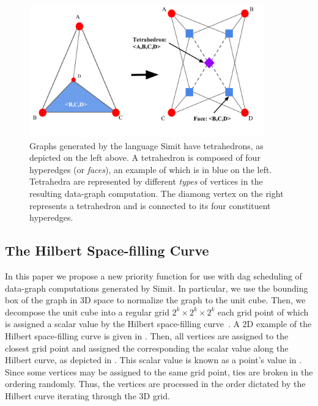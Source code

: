 \begin{figure}[]
\centering
\includegraphics[width=4in]{figures/tetrahedron.pdf}
\caption{Graphs generated by the language Simit have tetrahedrons,
as depicted on the left above.  A tetrahedron is composed of four
hyperedges (or \emph{faces}), an example
of which is in blue on the left.  Tetrahedra are represented by different
\emph{types} of vertices in the resulting data-graph computation.
The diamong vertex on the right represents a tetrahedron and is 
connected to its four constituent hyperedges.}
\label{fig:tetrahedron}
\end{figure}



\subsection{The Hilbert Space-filling Curve}

In this paper we propose a new priority function for 
use with dag scheduling of data-graph computations generated
by Simit.  In particular, we use the bounding box of the
graph in 3D space to normalize the graph to the
unit cube.  Then, we decompose the unit cube into a regular
grid $2^k \times 2^k \times 2^k$ each grid point of which
is assigned a scalar value by the Hilbert space-filling curve~\cite{Hilbert70}.
A 2D example of the Hilbert space-filling
curve is given in .  Then, all vertices
are assigned to the closest grid point and assigned the 
corresponding the scalar value along the Hilbert curve, as
depicted in .  This
scalar value is known as a point's value in .  
Since some vertices may be assigned to the same grid point, ties
are broken in the ordering randomly.  Thus, the vertices are 
processed in the order dictated by the Hilbert curve iterating
through the 3D grid.


